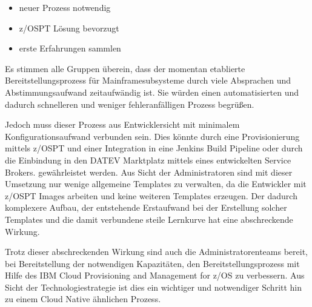 \begin{itemize}
\item neuer Prozess notwendig
\item z/OSPT Lösung bevorzugt
\item erste Erfahrungen sammlen
\end{itemize}

Es stimmen alle Gruppen überein, dass der momentan etablierte Bereitstellungsprozess für Mainframesubsysteme durch viele Absprachen und Abstimmungsaufwand zeitaufwändig ist.
Sie würden einen automatisierten und dadurch schnelleren und weniger fehleranfälligen Prozess begrüßen.

Jedoch muss dieser Prozess aus Entwicklersicht mit minimalem Konfigurationsaufwand verbunden sein.
Dies könnte durch eine Provisionierung mittels z/OSPT und einer  Integration in eine Jenkins Build Pipeline oder durch die Einbindung in den \glqq DATEV Marktplatz\grqq{} mittels eines entwickelten \glqq Service Brokers\grqq. gewährleistet werden.
Aus Sicht der Administratoren sind mit dieser Umsetzung nur wenige allgemeine Templates zu verwalten, da die Entwickler mit z/OSPT Images arbeiten und keine weiteren Templates erzeugen.
Der dadurch komplexere Aufbau, der entstehende Erstaufwand bei der Erstellung solcher Templates  und die damit verbundene steile Lernkurve hat eine abschreckende Wirkung.

Trotz dieser abschreckenden Wirkung sind auch die Administratorenteams bereit, bei Bereitstellung der notwendigen Kapazitäten, den Bereitstellungsprozess mit Hilfe des \glqq IBM Cloud Provisioning and Management for z/OS\grqq{} zu verbessern.
Aus Sicht der Technologiestrategie ist dies ein wichtiger und notwendiger Schritt hin zu einem Cloud Native ähnlichen Prozess.
